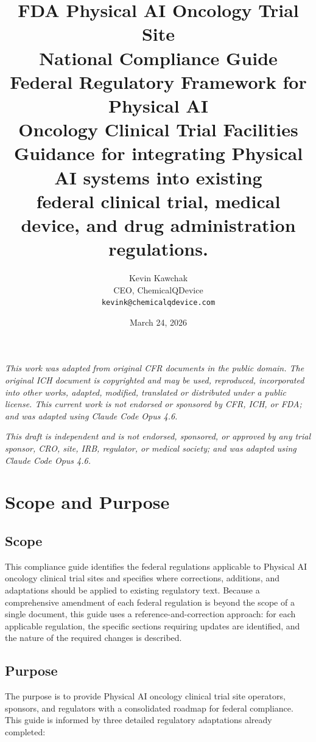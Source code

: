 \documentclass[11pt,letterpaper]{article}
\title{%
  \textbf{FDA Physical AI Oncology Trial Site}\\
  \textbf{National Compliance Guide}\\[6pt]
  \large Federal Regulatory Framework for Physical AI\\
  Oncology Clinical Trial Facilities\\[6pt]
  \normalsize Guidance for integrating Physical AI systems into existing\\
  federal clinical trial, medical device, and drug administration regulations.
}
\author{%
  Kevin Kawchak\\
  CEO, ChemicalQDevice\\
  \texttt{kevink@chemicalqdevice.com}
}
\date{March 24, 2026}
\begin{document}
\maketitle
\thispagestyle{fancy}

\begin{center}
\footnotesize
\textit{This work was adapted from original CFR documents in the public domain.
The original ICH document is copyrighted and may be used, reproduced,
incorporated into other works, adapted, modified, translated or distributed
under a public license. This current work is not endorsed or sponsored by
CFR, ICH, or FDA; and was adapted using Claude Code Opus 4.6.}
\end{center}

\vspace{0.5em}

\begin{center}
\footnotesize
\textit{This draft is independent and is not endorsed, sponsored, or approved
by any trial sponsor, CRO, site, IRB, regulator, or medical society;
and was adapted using Claude Code Opus 4.6.}
\end{center}

\vspace{1em}
\tableofcontents
\newpage

\section{Scope and Purpose}

\subsection{Scope}

This compliance guide identifies the federal regulations applicable to
Physical AI oncology clinical trial sites and specifies where corrections,
additions, and adaptations should be applied to existing regulatory text.
Because a comprehensive amendment of each federal regulation is beyond the
scope of a single document, this guide uses a reference-and-correction approach:
for each applicable regulation, the specific sections requiring updates are
identified, and the nature of the required changes is described.

\subsection{Purpose}

The purpose is to provide Physical AI oncology clinical trial site operators,
sponsors, and regulators with a consolidated roadmap for federal compliance.
This guide is informed by three detailed regulatory adaptations already
completed:
\end{document}
